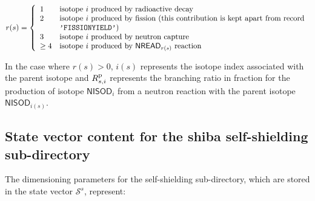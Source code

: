 \begin{displaymath}
r(s) = \left\{
\begin{array}{ll}
1 & \textrm{isotope $i$ produced by radioactive decay}\\
2 & \textrm{isotope $i$ produced by fission (this contribution is kept apart from record} \\
  & \textrm{{\tt 'FISSIONYIELD'})} \\
3 & \textrm{isotope $i$ produced by neutron capture} \\
\ge 4 & \textrm{isotope $i$ produced by $\mathsf{NREAD}_{r(s)}$ reaction}
\end{array} \right.
\end{displaymath}

In the case where $r(s)>0$, $i(s)$ represents the isotope index associated
with the parent isotope and $R_{s,i}^{\rm p}$ represents the branching
ratio in fraction for the production of isotope $\mathsf{NISOD}_{i}$ from a neutron
reaction with the parent isotope $\mathsf{NISOD}_{i(s)}$.

\goodbreak

\subsection{State vector content for the {\sc shiba} self-shielding sub-directory}\label{sect:ssshibastate}

The dimensioning parameters for the self-shielding sub-directory, which are stored in the state vector
$\mathcal{S}^{s}$, represent:

